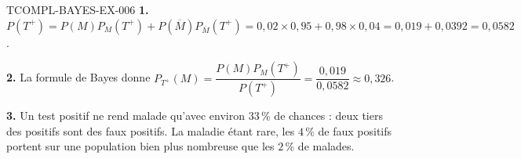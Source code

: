 \begin{corrige}{TCOMPL-BAYES-EX-006}
\textbf{1.} $P(T^+)=P(M)P_M(T^+)+P(\overline{M})P_{\overline{M}}(T^+)
=0{,}02\times0{,}95+0{,}98\times0{,}04=0{,}019+0{,}0392=0{,}0582$.

\textbf{2.} La formule de Bayes donne
$P_{T^+}(M)=\dfrac{P(M)P_M(T^+)}{P(T^+)}=\dfrac{0{,}019}{0{,}0582}
\approx0{,}326$.

\textbf{3.} Un test positif ne rend malade qu'avec environ $33\,\%$ de
chances : deux tiers des positifs sont des faux positifs. La maladie étant
rare, les $4\,\%$ de faux positifs portent sur une population bien plus
nombreuse que les $2\,\%$ de malades.
\end{corrige}

